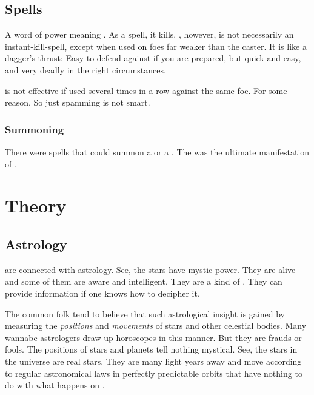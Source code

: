 \subsection{Spells}
\begin{gloss}
  A  word of power meaning . 
  As a spell, it kills. 
  , however, is not necessarily an instant-kill-spell, except when used on foes far weaker than the caster. 
  It is like a dagger's thrust: 
  Easy to defend against if you are prepared, but quick and easy, and very deadly in the right circumstances. 
  
   is not effective if used several times in a row against the same foe. 
  For some reason. 
  So just spamming  is not smart. 
\end{gloss}





\subsubsection{Summoning}
There were spells that could summon a \malgryph or a \salamander. 
The \salamander was the ultimate manifestation of . 















\section{\Matrix Theory}







\subsection{Astrology}
\Matrices{} are connected with {astrology}. 
See, the stars have mystic power. 
They are alive and some of them are aware and intelligent. 
They are a kind of . 
They can provide information if one knows how to decipher it. 

The common folk tend to believe that such astrological insight is gained by measuring the \emph{positions} and \emph{movements} of stars and other celestial bodies. 
Many wannabe astrologers draw up horoscopes in this manner. 
But they are frauds or fools. 
The positions of stars and planets tell nothing mystical. 
See, the stars in the \Miith{} universe are real stars. 
They are many light years away and move according to regular astronomical laws in perfectly predictable orbits that have nothing to do with what happens on \Miith. 

